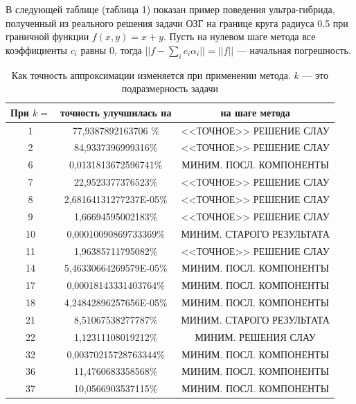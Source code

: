 \documentclass[a4paper]{article}
\begin{document}
В следующей таблице (таблица 1) показан пример поведения ультра-гибрида, полученный из реального решения задачи ОЗГ на границе круга радиуса 0.5 при граничной функции $f(x,y)=x+y$.
Пусть на нулевом шаге метода все коэффициенты $c_i$ равны 0, тогда $||f-\sum_i c_i \alpha_i||=||f||$ --- начальная погрешность.

\begin{table}[h]

  \label{tabl}
  \caption{Как точность аппроксимации изменяется при применении метода. $k$ --- это подразмерность задачи}
  \begin{center}
    \begin{tabular}[t]{|c|c|c|}
      \hline
      При $k=$ & точность улучшилась на & на шаге метода            \\
      \hline
      1        & 77,9387892163706 \%    & <<ТОЧНОЕ>> РЕШЕНИЕ СЛАУ   \\
      2        & 84,9337396999316\%     & <<ТОЧНОЕ>> РЕШЕНИЕ СЛАУ   \\
      6        & 0,0131813672596741\%   & МИНИМ. ПОСЛ. КОМПОНЕНТЫ   \\
      7        & 22,9523377376523\%     & <<ТОЧНОЕ>> РЕШЕНИЕ СЛАУ   \\
      8        & 2,68164131277237E-05\% & <<ТОЧНОЕ>> РЕШЕНИЕ СЛАУ   \\
      9        & 1,66694595002183\%     & <<ТОЧНОЕ>> РЕШЕНИЕ СЛАУ   \\
      10       & 0,00010090869733369\%  & МИНИМ. СТАРОГО РЕЗУЛЬТАТА \\
      11       & 1,96385711795082\%     & <<ТОЧНОЕ>> РЕШЕНИЕ СЛАУ   \\
      14       & 5,46330664269579E-05\% & МИНИМ. ПОСЛ. КОМПОНЕНТЫ   \\
      17       & 0,00018143331403764\%  & МИНИМ. ПОСЛ. КОМПОНЕНТЫ   \\
      18       & 4,24842896257656E-05\% & МИНИМ. ПОСЛ. КОМПОНЕНТЫ   \\
      21       & 8,51067538277787\%     & МИНИМ. СТАРОГО РЕЗУЛЬТАТА \\
      22       & 1,12311108019212\%     & МИНИМ. РЕШЕНИЯ СЛАУ       \\
      32       & 0,00370215728763344\%  & МИНИМ. ПОСЛ. КОМПОНЕНТЫ   \\
      36       & 11,4760683358568\%     & МИНИМ. ПОСЛ. КОМПОНЕНТЫ   \\
      37       & 10,0566903537115\%     & МИНИМ. ПОСЛ. КОМПОНЕНТЫ   \\

\end{tabular}
\end{center}
\end{table}
\end{document}
